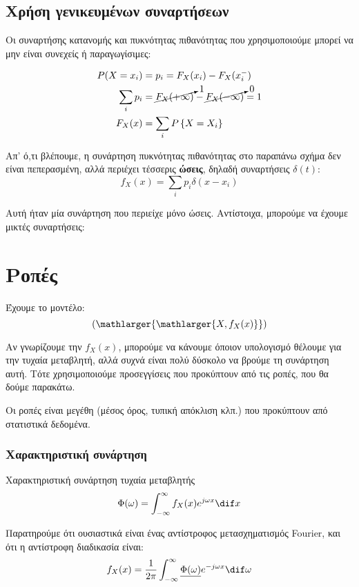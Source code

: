 \documentclass[11pt,a4paper,notitlepage,fleqn,final]{article}
\begin{document}
\subsection{Χρήση γενικευμένων συναρτήσεων}
Οι συναρτήσης κατανομής και πυκνότητας πιθανότητας που
χρησιμοποιούμε μπορεί να μην είναι συνεχείς ή παραγωγίσιμες:

\begin{align*}
	P(X=x_i) &= p_i = F_X(x_i) - F_X(x_i^-) \\
	\sum_i p_i &= \cancelto{1}{F_X(+\infty)} -
	 \cancelto{0}{F_X(-\infty)} = 1 \\
	F_X(x) &= \sum_i P \left\lbrace X=X_i \right\rbrace
\end{align*}

Απ' ό,τι βλέπουμε, η συνάρτηση πυκνότητας πιθανότητας στο
παραπάνω σχήμα δεν είναι πεπερασμένη, αλλά περιέχει τέσσερις
\textbf{ώσεις}, δηλαδή συναρτήσεις \( \delta(t) \):
\[
f_X(x) = \sum_i p_i \delta(x-x_i)
\]

Αυτή ήταν μία συνάρτηση που περιείχε μόνο ώσεις. Αντίστοιχα,
μπορούμε να έχουμε μικτές συναρτήσεις:

\section{Ροπές}
Έχουμε το μοντέλο:
\[
\left(\mathlarger{\mathlarger{X,f_X(x)}}\right)
\]

Αν γνωρίζουμε την \( f_X(x) \), μπορούμε να κάνουμε όποιον
υπολογισμό θέλουμε για την τυχαία μεταβλητή, αλλά συχνά είναι
πολύ δύσκολο να βρούμε τη συνάρτηση αυτή. Τότε χρησιμοποιούμε
προσεγγίσεις που προκύπτουν από τις ροπές, που θα δούμε παρακάτω.

Οι ροπές είναι μεγέθη (μέσος όρος, τυπική απόκλιση κλπ.) που
προκύπτουν από στατιστικά δεδομένα.

\subsubsection{Χαρακτηριστική συνάρτηση}
\begin{defn}{Χαρακτηριστική συνάρτηση τυχαία μεταβλητής}{}
	\[
	\Phi(\omega ) = \int_{-\infty}^{\infty} f_X(x) e^{j\omega x}
	\dif x
	\]
\end{defn}
Παρατηρούμε ότι ουσιαστικά είναι ένας αντίστροφος μετασχηματισμός
Fourier, και ότι η αντίστροφη διαδικασία είναι:
\[
f_X(x) = \frac{1}{2\pi} \int_{-\infty}^{\infty}
\underline{\Phi(\omega )} e^{-j\omega x}\dif \omega 
\]
\end{document}
